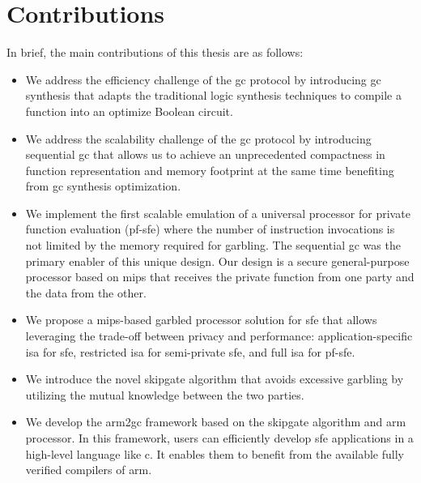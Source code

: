 \section{Contributions}
In brief, the main contributions of this thesis are as follows:
\begin{itemize}
  \item
  We address the efficiency challenge of the \acrshort{gc} protocol by introducing \acrshort{gc} synthesis that adapts the traditional logic synthesis techniques to compile a function into an optimize Boolean circuit.

  \item
  We address the scalability challenge of the \acrshort{gc} protocol by introducing sequential \acrshort{gc} that allows us to achieve an unprecedented compactness in function representation and memory footprint at the same time benefiting from \acrshort{gc} synthesis optimization.

  \item
  We implement the first scalable emulation of a universal processor for private function evaluation (\acrshort{pf-sfe}) where the number of instruction invocations is not limited by the memory required for garbling.
  The sequential \acrshort{gc} was the primary enabler of this unique design.
  Our design is a secure general-purpose processor based on \gls{mips} that receives the private function from one party and the data from the other.

  \item
  We propose a \gls{mips}-based garbled processor solution for \acrshort{sfe} that allows leveraging the trade-off between privacy and performance: application-specific \acrshort{isa} for \acrshort{sfe}, restricted \acrshort{isa} for semi-private \acrshort{sfe}, and full \acrshort{isa} for \acrshort{pf-sfe}.

  \item We introduce the novel \gls{skipgate} algorithm that avoids excessive garbling by utilizing the mutual knowledge between the two parties.

  \item
  We develop the \gls{arm2gc} framework based on the \gls{skipgate} algorithm and \gls{arm} processor.
  In this framework, users can efficiently develop \acrshort{sfe} applications in a high-level language like \gls{c}.
  It enables them to benefit from the available fully verified compilers of \gls{arm}.
\end{itemize}

